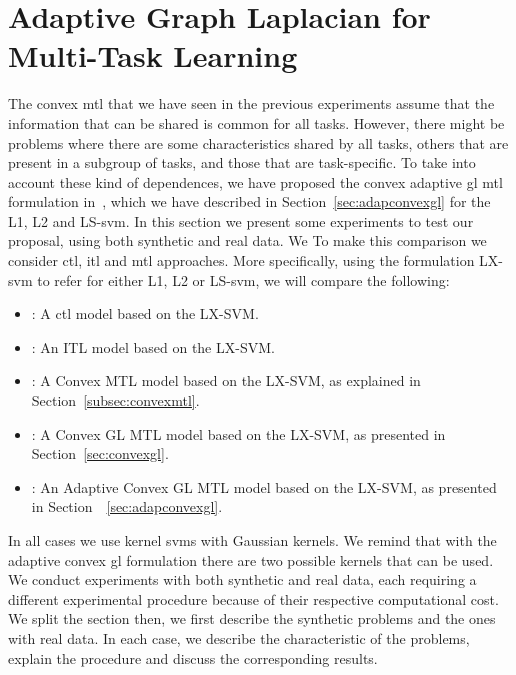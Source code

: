





















\section{Adaptive Graph Laplacian for Multi-Task Learning}

The convex \acrshort{mtl} that we have seen in the previous experiments assume that the information that can be shared is common for all tasks. However, there might be problems where there are some characteristics shared by all tasks, others that are present in a subgroup of tasks, and those that are task-specific.
%
To take into account these kind of dependences, we have proposed the convex adaptive \acrshort{gl} \acrshort{mtl} formulation in~\cite{RuizAD21_hais}, which we have described in Section~\ref{sec:adapconvexgl} for the L1, L2 and LS-\acrshort{svm}.
%
In this section we present some experiments to test our proposal, using both synthetic and real data. 
%
We 
To make this comparison we consider \acrshort{ctl}, \acrshort{itl} and \acrshort{mtl} approaches. More specifically, using the formulation LX-\acrshort{svm} to refer for either L1, L2 or LS-\acrshort{svm}, we will compare the following:
\begin{itemize}
    \item {}: A \acrshort{ctl} model based on the LX-SVM.
    \item {}: An ITL model based on the LX-SVM.
    \item {}: A Convex MTL model based on the LX-SVM, as explained in Section~\ref{subsec:convexmtl}.
    \item {}: A Convex GL MTL model based on the LX-SVM, as presented in Section~\ref{sec:convexgl}.
    \item {}: An Adaptive Convex GL MTL model based on the LX-SVM, as presented in Section~~\ref{sec:adapconvexgl}.
\end{itemize}
In all cases we use kernel \acrshort{svms} with Gaussian kernels. We remind that with the adaptive convex \acrshort{gl} formulation there are two possible kernels that can be used.
%
We conduct experiments with both synthetic and real data, each requiring a different experimental procedure because of their respective computational cost. We split the section then, we first describe the synthetic problems and the ones with real data. In each case, we describe the characteristic of the problems, explain the procedure and discuss the corresponding results. 



